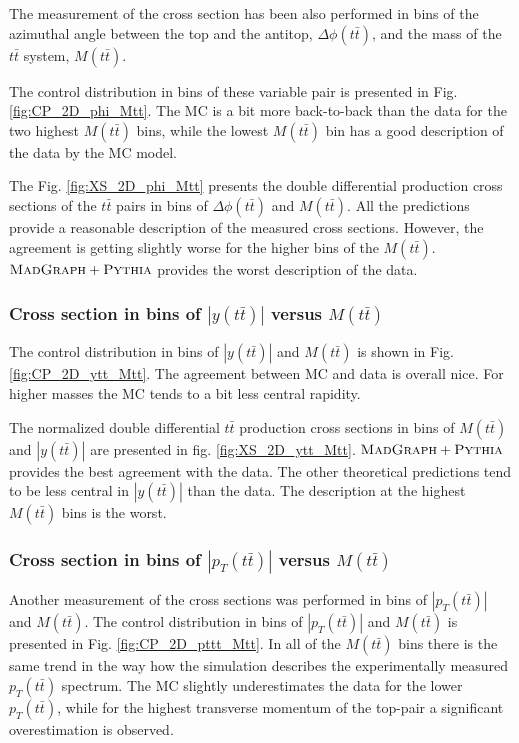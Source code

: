 The measurement of the cross section has been also performed in bins of the azimuthal angle between the top and the antitop, $\Delta\phi(t\bar{t})$, and the mass
of the $t\bar{t}$ system, $M(t\bar{t})$.

The control distribution in bins of these variable pair is presented in Fig. \ref{fig:CP_2D_phi_Mtt}. The MC is a bit more back-to-back than the data for the
two highest $M(t\bar{t})$ bins, while the lowest $M(t\bar{t})$ bin has a good description of the data by the MC model.

The Fig. \ref{fig:XS_2D_phi_Mtt} presents the double differential production cross sections of the $t\bar{t}$ pairs in bins of $\Delta\phi(t\bar{t})$ and $M(t\bar{t})$.
All the predictions provide a reasonable description of the measured cross sections. However, the agreement is getting slightly worse for the higher bins of the $M(t\bar{t})$.
$\textsc{MadGraph}+\textsc{Pythia}$ provides the worst description of the data.

\subsubsection{Cross section in bins of $|y(t\bar{t})|$ versus $M(t\bar{t})$}

The control distribution in bins of $|y(t\bar{t})|$ and $M(t\bar{t})$ is shown in Fig. \ref{fig:CP_2D_ytt_Mtt}. The agreement between MC and data is overall nice.
For higher masses the MC tends to a bit less central rapidity.

The normalized double differential $t\bar{t}$ production cross sections in bins of $M(t\bar{t})$ and $|y(t\bar{t})|$ are presented in fig. \ref{fig:XS_2D_ytt_Mtt}.
$\textsc{MadGraph}+\textsc{Pythia}$ provides the best agreement with the data. 
The other theoretical predictions tend to be less central in $|y(t\bar{t})|$ than the data. 
The description at the highest $M(t\bar{t})$ bins is the worst.

\subsubsection{Cross section in bins of $|p_{T}(t\bar{t})|$ versus $M(t\bar{t})$}

Another measurement of the cross sections was performed in bins of $|p_{T}(t\bar{t})|$ and $M(t\bar{t})$.
The control distribution in bins of $|p_{T}(t\bar{t})|$ and $M(t\bar{t})$ is presented in Fig. \ref{fig:CP_2D_pttt_Mtt}. In all of the $M(t\bar{t})$
bins there is the same trend in the way how the simulation describes the experimentally measured $p_{T}(t\bar{t})$ spectrum. The MC slightly underestimates
the data for the lower $p_{T}(t\bar{t})$, while for the highest transverse momentum of the top-pair a significant overestimation is observed.


